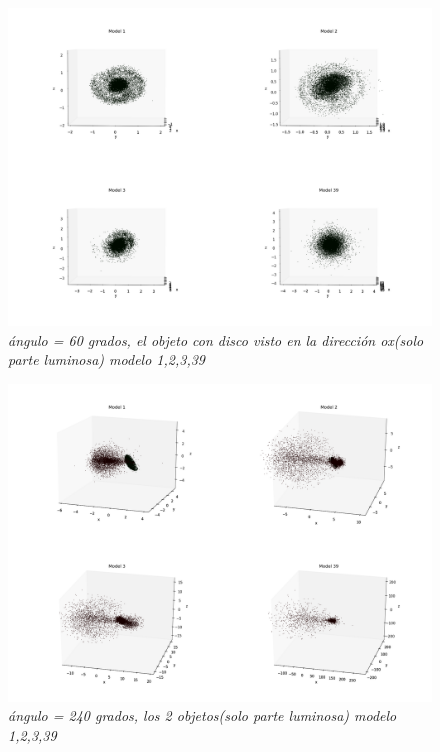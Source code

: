 \documentclass[12pt]{article} %
\renewcommand{\=}[1]{\stackrel{#1}{=}} %
\theoremstyle{definition}
\theoremstyle{remark}
\begin{document}
\begin{figure}[!ht]
 \centering
 \includegraphics[scale=0.2]{60deg-m-c2.png}
 \caption{\emph{ ángulo = 60 grados, el objeto con disco visto en la dirección ox(solo parte luminosa) modelo 1,2,3,39 }}
\end{figure}

\begin{figure}[!ht]
 \centering
 \includegraphics[scale=0.2]{240deg-m.png}
 \caption{\emph{ ángulo = 240 grados, los 2 objetos(solo parte luminosa) modelo 1,2,3,39 }}
\end{figure}
\end{document}
